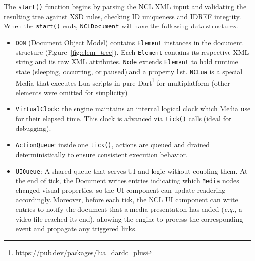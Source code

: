 \documentclass[sigconf,authorversion,review,authordraft]{webmedia}
\begin{document}
The \texttt{start()} function begins by parsing the NCL XML input and validating the resulting tree against XSD rules, checking ID uniqueness and IDREF integrity. When the \texttt{start()} ends, \texttt{NCLDocument} will have the following data structures:
\begin{itemize}
  \item \texttt{DOM} (Document Object Model) contains \texttt{Element} instances in the document structure (Figure~\ref{fig:elem_tree}). Each \texttt{Element} contains its respective XML string and its raw XML attributes. \texttt{Node} extends \texttt{Element} to hold runtime state (sleeping, occurring, or paused) and a property list. \texttt{NCLua} is a special Media that executes Lua scripts in pure Dart\footnote{\url{https://pub.dev/packages/lua_dardo_plus}} for multiplatform (other elements were omitted for simplicity).
  \item \texttt{VirtualClock}: the engine maintains an internal logical clock which Media use for their elapsed time. This clock is advanced via \texttt{tick()} calls (ideal for debugging).
  \item \texttt{ActionQueue}: inside one \texttt{tick()}, actions are queued and drained deterministically to ensure consistent execution behavior.
  \item \texttt{UIQueue}: A shared queue that serves UI and logic without coupling them. At the end of tick, the Document writes entries indicating which \texttt{Media} nodes changed visual properties, so the UI component can update rendering accordingly. Moreover, before each tick, the NCL UI component can write entries to notify the document that a media presentation has ended (\textit{e.g.}, a video file reached its end), allowing the engine to process the corresponding event and propagate any triggered links.
\end{itemize}
\end{document}
